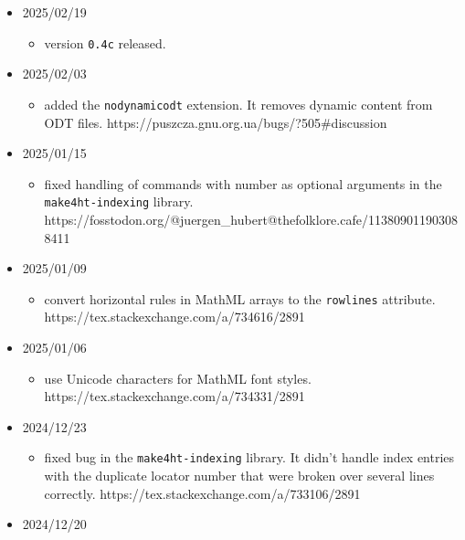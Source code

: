 \begin{itemize}
  \begin{itemize}
  \tightlist
  \item
    fixed bug in the \texttt{make4ht-indexing} library. If subentries
    generated by Xindex keywords were only numbers, they were mistaken
    for the page numbers.
    https://tug.org/pipermail/tex4ht/2025q1/003699.html
  \end{itemize}
\item
  2025/02/19

  \begin{itemize}
  \tightlist
  \item
    version \texttt{0.4c} released.
  \end{itemize}
\item
  2025/02/03

  \begin{itemize}
  \tightlist
  \item
    added the \texttt{nodynamicodt} extension. It removes dynamic
    content from ODT files.
    https://puszcza.gnu.org.ua/bugs/?505\#discussion
  \end{itemize}
\item
  2025/01/15

  \begin{itemize}
  \tightlist
  \item
    fixed handling of commands with number as optional arguments in the
    \texttt{make4ht-indexing} library.
    https://fosstodon.org/@juergen\_hubert@thefolklore.cafe/113809011903088411
  \end{itemize}
\item
  2025/01/09

  \begin{itemize}
  \tightlist
  \item
    convert horizontal rules in MathML arrays to the \texttt{rowlines}
    attribute. https://tex.stackexchange.com/a/734616/2891
  \end{itemize}
\item
  2025/01/06

  \begin{itemize}
  \tightlist
  \item
    use Unicode characters for MathML font styles.
    https://tex.stackexchange.com/a/734331/2891
  \end{itemize}
\item
  2024/12/23

  \begin{itemize}
  \tightlist
  \item
    fixed bug in the \texttt{make4ht-indexing} library. It didn't handle
    index entries with the duplicate locator number that were broken
    over several lines correctly.
    https://tex.stackexchange.com/a/733106/2891
  \end{itemize}
\item
  2024/12/20


\end{itemize}
